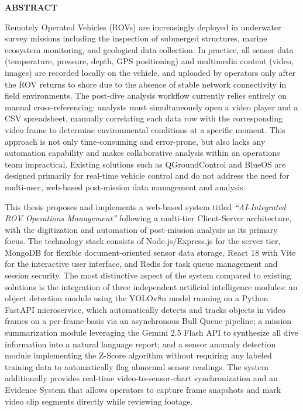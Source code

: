\documentclass[../DoAn.tex]{subfiles}
\begin{document}
{%

\begin{center}
    \Large{\textbf{ABSTRACT}}\\
\end{center}
\vspace{1cm}

Remotely Operated Vehicles (ROVs) are increasingly deployed in underwater survey missions including the inspection of submerged structures, marine ecosystem monitoring, and geological data collection. In practice, all sensor data (temperature, pressure, depth, GPS positioning) and multimedia content (video, images) are recorded locally on the vehicle, and uploaded by operators only after the ROV returns to shore due to the absence of stable network connectivity in field environments. The post-dive analysis workflow currently relies entirely on manual cross-referencing: analysts must simultaneously open a video player and a CSV spreadsheet, manually correlating each data row with the corresponding video frame to determine environmental conditions at a specific moment. This approach is not only time-consuming and error-prone, but also lacks any automation capability and makes collaborative analysis within an operations team impractical. Existing solutions such as QGroundControl and BlueOS are designed primarily for real-time vehicle control and do not address the need for multi-user, web-based post-mission data management and analysis.

This thesis proposes and implements a web-based system titled \textit{``AI-Integrated ROV Operations Management''} following a multi-tier Client-Server architecture, with the digitization and automation of post-mission analysis as its primary focus. The technology stack consists of Node.js/Express.js for the server tier, MongoDB for flexible document-oriented sensor data storage, React 18 with Vite for the interactive user interface, and Redis for task queue management and session security. The most distinctive aspect of the system compared to existing solutions is the integration of three independent artificial intelligence modules: an object detection module using the YOLOv8n model running on a Python FastAPI microservice, which automatically detects and tracks objects in video frames on a per-frame basis via an asynchronous Bull Queue pipeline; a mission summarization module leveraging the Gemini 2.5 Flash API to synthesize all dive information into a natural language report; and a sensor anomaly detection module implementing the Z-Score algorithm without requiring any labeled training data to automatically flag abnormal sensor readings. The system additionally provides real-time video-to-sensor-chart synchronization and an Evidence System that allows operators to capture frame snapshots and mark video clip segments directly while reviewing footage.

}
\end{document}
